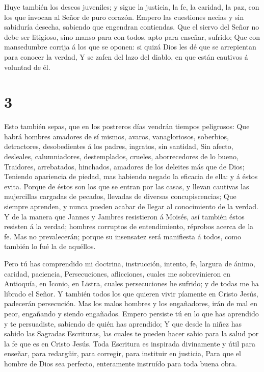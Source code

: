  Huye también los deseos juveniles; y sigue la justicia, la
fe, la caridad, la paz, con los que invocan al Señor de puro corazón.
 Empero las cuestiones necias y sin sabiduría desecha,
sabiendo que engendran contiendas.  Que el siervo del Señor
no debe ser litigioso, sino manso para con todos, apto para enseñar,
sufrido;  Que con mansedumbre corrija á los que se oponen:
si quizá Dios les dé que se arrepientan para conocer la verdad,
 Y se zafen del lazo del diablo, en que están cautivos á
voluntad de él.

\hypertarget{section-2}{%
\section{3}\label{section-2}}

 Esto también sepas, que en los postreros días vendrán
tiempos peligrosos:  Que habrá hombres amadores de sí
mismos, avaros, vanagloriosos, soberbios, detractores, desobedientes á
los padres, ingratos, sin santidad,  Sin afecto, desleales,
calumniadores, destemplados, crueles, aborrecedores de lo bueno,
 Traidores, arrebatados, hinchados, amadores de los deleites
más que de Dios;  Teniendo apariencia de piedad, mas
habiendo negado la eficacia de ella: y á éstos evita. 
Porque de éstos son los que se entran por las casas, y llevan cautivas
las mujercillas cargadas de pecados, llevadas de diversas
concupiscencias;  Que siempre aprenden, y nunca pueden
acabar de llegar al conocimiento de la verdad.  Y de la
manera que Jannes y Jambres resistieron á Moisés, así también éstos
resisten á la verdad; hombres corruptos de entendimiento, réprobos
acerca de la fe.  Mas no prevalecerán; porque su insensatez
será manifiesta á todos, como también lo fué la de aquéllos.

 Pero tú has comprendido mi doctrina, instrucción, intento,
fe, largura de ánimo, caridad, paciencia,  Persecuciones,
aflicciones, cuales me sobrevinieron en Antioquía, en Iconio, en Listra,
cuales persecuciones he sufrido; y de todas me ha librado el Señor.
 Y también todos los que quieren vivir píamente en Cristo
Jesús, padecerán persecución.  Mas los malos hombres y los
engañadores, irán de mal en peor, engañando y siendo engañados.
 Empero persiste tú en lo que has aprendido y te
persuadiste, sabiendo de quién has aprendido;  Y que desde
la niñez has sabido las Sagradas Escrituras, las cuales te pueden hacer
sabio para la salud por la fe que es en Cristo Jesús.  Toda
Escritura es inspirada divinamente y útil para enseñar, para redargüir,
para corregir, para instituir en justicia,  Para que el
hombre de Dios sea perfecto, enteramente instruído para toda buena obra.

